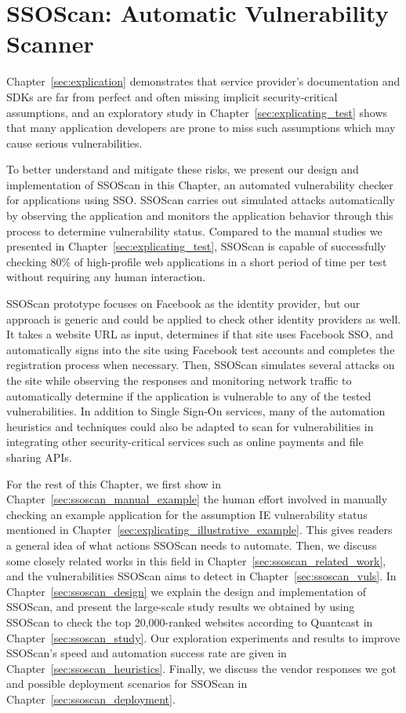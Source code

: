 \chapter{SSOScan: Automatic Vulnerability Scanner}
\label{sec:ssoscan}

Chapter~\ref{sec:explication} demonstrates that service provider's documentation and SDKs are far from perfect and often missing implicit security-critical assumptions, and an exploratory study in Chapter~\ref{sec:explicating_test} shows that many application developers are prone to miss such assumptions which may cause serious vulnerabilities.  

To better understand and mitigate these risks, we present our design and implementation of SSOScan in this Chapter, an automated vulnerability checker for applications using SSO.  SSOScan carries out simulated attacks automatically by observing the application and monitors the application behavior through this process to determine vulnerability status.  Compared to the manual studies we presented in Chapter~\ref{sec:explicating_test}, SSOScan is capable of successfully checking 80\% of high-profile web applications in a short period of time per test without requiring any human interaction.  

SSOScan prototype focuses on Facebook as the identity provider, but our approach is generic and could be applied to check other identity providers as well.  It takes a website URL as input, determines if that site uses Facebook SSO, and automatically signs into the site using Facebook test accounts and completes the registration process when necessary.  Then, SSOScan simulates several attacks on the site while observing the responses and monitoring network traffic to automatically determine if the application is vulnerable to any of the tested vulnerabilities.  In addition to Single Sign-On services, many of the automation heuristics and techniques could also be adapted to scan for vulnerabilities in integrating other security-critical services such as online payments and file sharing APIs.

For the rest of this Chapter, we first show in Chapter~\ref{sec:ssoscan_manual_example} the human effort involved in manually checking an example application for the assumption IE vulnerability status mentioned in Chapter~\ref{sec:explicating_illustrative_example}.  This gives readers a general idea of what actions SSOScan needs to automate.  Then, we discuss some closely related works in this field in Chapter~\ref{sec:ssoscan_related_work}, and the vulnerabilities SSOScan aims to detect in Chapter~\ref{sec:ssoscan_vuls}.  In Chapter~\ref{sec:ssoscan_design} we explain the design and implementation of SSOScan, and present the large-scale study results we obtained by using SSOScan to check the top 20,000-ranked websites according to Quantcast in Chapter~\ref{sec:ssoscan_study}.  Our exploration experiments and results to improve SSOScan's speed and automation success rate are given in Chapter~\ref{sec:ssoscan_heuristics}.  Finally, we discuss the vendor responses we got and possible deployment scenarios for SSOScan in Chapter~\ref{sec:ssoscan_deployment}.

